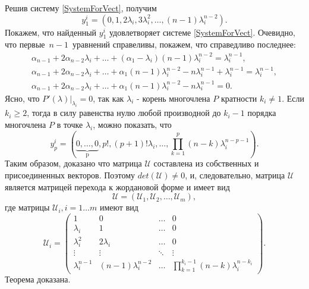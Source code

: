 Решив систему \eqref{SystemForVect}, получим
$$
y^i_1 = \left(0, 1, 2 \lambda_i, 3 \lambda_i ^2, \dots, (n-1)\lambda_i ^{n-2} \right).
$$
Покажем, что найденный $y^i_1$ удовлетворяет системе \eqref{SystemForVect}. Очевидно, что первые~$n-1$~уравнений справеливы, покажем, что справедливо последнее:
\begin{align*}
\alpha_{n-1} + 2 \alpha_{n-2} \lambda_i + \dots + (\alpha_1 - \lambda_i) (n-1) \lambda_i ^{n-2} = \lambda_i ^{n-1}, \\
\alpha_{n-1} + 2 \alpha_{n-2} \lambda_i + \dots + \alpha_1 (n-1)\lambda_i ^{n-2} - n\lambda_i^{n-1} + \lambda_i ^{n-1} = \lambda_i ^{n-1}, \\
\alpha_{n-1} + 2 \alpha_{n-2} \lambda_i + \dots + \alpha_1 (n-1)\lambda_i ^{n-2} - n\lambda_i^{n-1} = 0.
\end{align*}
Ясно, что $\left.P'(\lambda)\right|_{\lambda_i} = 0$, так как $\lambda_i$ - корень многочлена $P$ кратности $k_i \ne 1$.
Если $k_i \geqslant 2$, тогда в силу равенства нулю любой производной до $k_i-1$ порядка многочлена $P$ в точке $\lambda_i$, можно показать, что
$$
y^i_p = \left(\underbrace{0, \dots, 0}_{\text{p}}, p!, (p+1)! \lambda_i, \dots, \prod_{k=1}^p(n-k)\lambda_i ^{n-p-1} \right).
$$
Таким образом, доказано что матрица $\mathcal{U}$ составлена из собственных и присоединенных векторов. Поэтому $det(\mathcal{U}) \ne 0$, и, следовательно, матрица $\mathcal{U}$ является матрицей перехода к жордановой форме и имеет вид 
$$
\mathcal{U} = \left( \mathcal{U}_1, \mathcal{U}_2, \dots, \mathcal{U}_m \right),
$$
где матрицы $\mathcal{U}_i, i=1 \dots m$ имеют вид
$$
\mathcal{U}_i = \begin{pmatrix}
1 & 0 & \dots & 0 \\
\lambda_i & 1 & \dots & 0 \\ 
\lambda_i^2 & 2\lambda_i & \dots & 0 \\
\vdots & \vdots & \ddots & \vdots \\
\lambda_i^{n-1} & (n-1)\lambda_i^{n-2} & \dots & \prod_{k=1}^{k_i-1}(n-k)\lambda_i^{n-k_i}
\end{pmatrix}.
$$
Теорема доказана.

